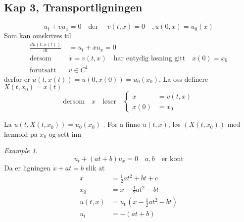 \documentclass{article}
\theoremstyle{remark}
\newtheorem{example}{Example}
\begin{document}
 \subsection{Kap 3, Transportligningen}%
 \label{sub:kap_3_transportligningen}

 \[
 u_{t} + v u_{x} =0 \quad  \text{der } \quad  v\left( t,x \right) = 0 \quad  , u\left( 0,x \right) = u_{0} \left( x \right)   
 \] 
 Som kan omskrives til \[
   \begin{split}
 \frac{d u\left( t,x\left( t \right) \right)}{d t} &= u_{t} + \dot{x} u_{x} = 0  \\
 \text{dersom} \quad  & \dot{x} = v\left( t,x \right) \quad \text{har entydig løsning gitt}\quad x\left( 0 \right) = x_{0} \\
 \text{forutsatt} \quad   &  v \in C^{1} 
   \end{split}
 \] 
 derfor er $u\left( t, x\left( t \right) \right) = u\left( 0, x\left( 0 \right) \right) = u_{0} \left( x_{0} \right)$. La oss definere $X\left( t, x_{0} \right) = x\left( t \right)$ \[
 \text{dersom} \quad  x \quad \text{løser} \quad \begin{cases}
   \dot{x} &= v\left( t,x \right) \\
   x\left( 0 \right) &= x_{0}  
 \end{cases}  
 \] 

 La $u\left( t, X\left( t,x_{0} \right) \right) = u_{0} \left( x_{0} \right)$ . For a finne $u\left( t,x \right)$, løs $\left( X\left( t,x_{0} \right) \right)$ med hennold 
 pa $x_{0} $ og sett inn  
 
 \begin{example}
   \[
   u_{t} + \left( at +b \right)u_{x} = 0  \quad  a,b \quad \text{er kont}  
   \]
   Da er ligningen $\dot{x} + at = b$ slik at \[
   \begin{split}
     x &=  \frac{1}{2} at^2  + bt  +c\\
     x_{0} &=  x - \frac{1}{2  } at^2 - bt \\
     u\left( t,x \right) &= u_{0} \left( x-\frac{1}{2} at^2 -bt \right)\\
     u_{t} &= -\left( at +b \right)
   \end{split}
   \] 
 \end{example}



 
 




\end{document}
